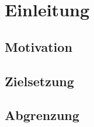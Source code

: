 \section{Einleitung}


\subsection{Motivation}


\subsection{Zielsetzung}


\subsection{Abgrenzung}
